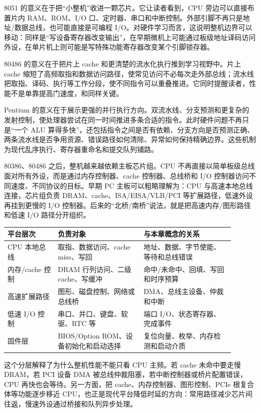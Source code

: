 8051 的意义在于把“小整机”收进一颗芯片。它让读者看到，CPU 旁边可以直接布置片内 RAM、ROM、I/O 口、定时器、串口和中断控制。外部引脚不再只是地址/数据总线，也可能直接是可编程 I/O。对硬件学习而言，这说明整机边界可以移动：同样是“写设备寄存器改变输出”，在早期微机上可能通过板级地址译码访问外设，在单片机上则可能是写特殊功能寄存器改变某个引脚锁存器。

80486 的意义在于把片上 cache 和更清楚的流水化执行推到学习视野中。片上 cache 缩短了高频取指和数据访问路径，使常见访问不必每次走外部总线；流水线把取指、译码、执行等工作分段，使不同指令可以重叠推进。它同时提醒读者，性能不是单靠提高门速度，和同样关键。

Pentium 的意义在于展示更强的并行执行方向。双流水线、分支预测和更复杂的发射控制，使处理器尝试在同一时间推进多条合适的指令。此时硬件问题不再只是“一个 ALU 算得多快”，还包括指令之间是否有依赖、分支方向是否预测正确、两条流水线是否争用资源、错误路径如何清除、异常如何保持精确边界。这些机制为现代乱序执行、寄存器重命名和提交队列铺路。

80386、80486 之后，整机越来越依赖主板芯片组。CPU 不再直接以简单板级总线面对所有外设，而是通过内存控制器、cache 控制器、总线桥和 I/O 控制器访问不同速度、不同协议的目标。早期 PC 主板可以粗略理解为：CPU 与高速本地总线连接，芯片组负责 DRAM、cache、ISA/EISA/VLB/PCI 等扩展路径，低速外设再挂到更慢的 I/O 控制器。后来的“北桥/南桥”说法，就是把高速内存/图形路径和低速 I/O 路径分开组织。

\begin{longtable}{L{0.2\linewidth}L{0.34\linewidth}L{0.36\linewidth}}
\toprule
平台层次 & 负责对象 & 与本章概念的关系 \\
\midrule
CPU 本地总线 & 取指、数据访问、cache miss、写回 & 地址、数据、字节使能、等待和总线错误 \\
内存/cache 控制 & DRAM 行列访问、二级 cache、写缓冲 & 命中/未命中、回填、写回和时序预算 \\
高速扩展路径 & 图形、磁盘控制、网络或总线桥 & DMA、总线主设备、仲裁和中断 \\
低速 I/O 控制 & 串口、并口、键盘、软驱、RTC 等 & 端口 I/O、状态寄存器、完成事件 \\
固件层 & BIOS/Option ROM、设备初始化和启动选择 & 复位向量、枚举、内存检测和启动介质 \\
\bottomrule
\end{longtable}

这个分层解释了为什么整机性能不能只看 CPU 主频。若 cache 未命中要走慢 DRAM，若 PCI 设备 DMA 被总线仲裁阻塞，若中断控制器或桥片配置错误，CPU 再快也会等待。另一方面，把 cache、内存控制器、图形控制、PCIe 根复合体等功能逐步移近 CPU，也正是现代平台降低时延的方向：常用路径减少芯片间往返，慢速外设通过桥接和队列异步处理。


